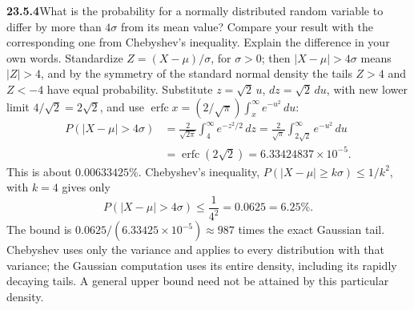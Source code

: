 \par\bigskip
\noindent\textbf{23.5.4}\quad What is the probability for a
normally distributed random variable to differ by more than
$4\sigma$ from its mean value? Compare your result with the
corresponding one from Chebyshev's inequality. Explain the
difference in your own words. 
\solution
Standardize $Z=(X-\mu)/\sigma$, for $\sigma>0$; then
$|X-\mu|>4\sigma$ means $|Z|>4$, and by the symmetry of the standard
normal density the tails $Z>4$ and $Z<-4$ have equal probability.
Substitute $z=\sqrt2\,u$, $dz=\sqrt2\,du$, with new lower limit
$4/\sqrt2=2\sqrt2$, and use
$\operatorname{erfc}x=(2/\sqrt\pi)\int_x^\infty e^{-u^2}\,du$:
\begin{align*}
P(|X-\mu|>4\sigma)&=\frac2{\sqrt{2\pi}}\int_4^\infty e^{-z^2/2}\,dz
=\frac2{\sqrt\pi}\int_{2\sqrt2}^\infty e^{-u^2}\,du\\
&=\operatorname{erfc}(2\sqrt2)
=\boxed{6.33424837\times10^{-5}}.
\end{align*}
This is about $0.00633425\%$. Chebyshev's inequality,
$P(|X-\mu|\ge k\sigma)\le1/k^2$, with $k=4$ gives only
\[
P(|X-\mu|>4\sigma)\le\frac1{4^2}=0.0625=6.25\%.
\]
The bound is $0.0625/(6.33425\times10^{-5})\approx987$ times the exact
Gaussian tail. Chebyshev uses only the variance and applies to every
distribution with that variance;
the Gaussian computation uses its entire density, including its rapidly
decaying tails. A general upper bound need not be attained by this
particular density.


